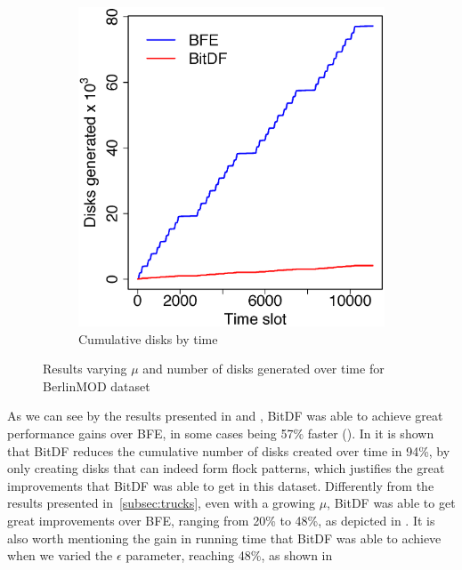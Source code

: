 \begin{figure}[h!]
\begin{subfigure}[t]{0.48\textwidth}
        \includegraphics[width=\textwidth]{images/BerlinMOD_d.eps}
        \caption{Cumulative disks by time}
        \label{fig:berlinmod_disks}
    \end{subfigure}
    \caption{Results varying $\mu$ and number of disks generated over time for BerlinMOD dataset}
    \label{fig:berlinmod_results2}
\end{figure}

As we can see by the results presented in  and , BitDF was
able to achieve great performance gains over BFE, in some cases being 57\% faster (). In
 it is shown that BitDF reduces the cumulative number of disks created over time in 94\%, by
only creating disks that can indeed form flock patterns, which justifies the great improvements that BitDF was able to
get in this dataset.  Differently from the results presented in~\ref{subsec:trucks}, even with a growing $\mu$, BitDF
was able to get great improvements over BFE, ranging from 20\% to 48\%, as depicted in . It
is also worth mentioning the gain in running time that BitDF was able to achieve when we varied the $\epsilon$
parameter, reaching 48\%, as shown in 

